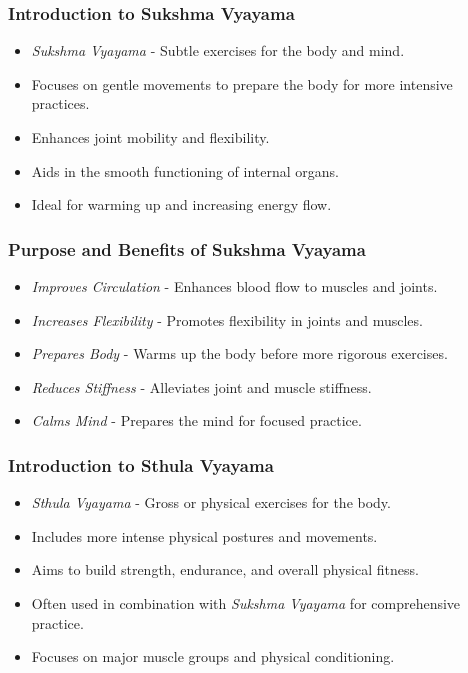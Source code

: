 \begin{frame}[fragile]\frametitle{Introduction to Sukshma Vyayama}

      \begin{itemize}
		\item \textit{Sukshma Vyayama} - Subtle exercises for the body and mind.
		\item Focuses on gentle movements to prepare the body for more intensive practices.
		\item Enhances joint mobility and flexibility.
		\item Aids in the smooth functioning of internal organs.
		\item Ideal for warming up and increasing energy flow.
	  \end{itemize}

\end{frame}

\begin{frame}[fragile]\frametitle{Purpose and Benefits of Sukshma Vyayama}

      \begin{itemize}
		\item \textit{Improves Circulation} - Enhances blood flow to muscles and joints.
		\item \textit{Increases Flexibility} - Promotes flexibility in joints and muscles.
		\item \textit{Prepares Body} - Warms up the body before more rigorous exercises.
		\item \textit{Reduces Stiffness} - Alleviates joint and muscle stiffness.
		\item \textit{Calms Mind} - Prepares the mind for focused practice.
	  \end{itemize}

\end{frame}

\begin{frame}[fragile]\frametitle{Introduction to Sthula Vyayama}

      \begin{itemize}
		\item \textit{Sthula Vyayama} - Gross or physical exercises for the body.
		\item Includes more intense physical postures and movements.
		\item Aims to build strength, endurance, and overall physical fitness.
		\item Often used in combination with \textit{Sukshma Vyayama} for comprehensive practice.
		\item Focuses on major muscle groups and physical conditioning.
	  \end{itemize}

\end{frame}

